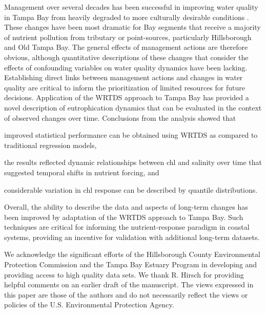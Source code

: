 \documentclass{svjour3}\usepackage[]{graphicx}\usepackage[]{color}
\begin{document}
Management over several decades has been successful in improving water quality in Tampa Bay from heavily degraded to more culturally desirable conditions \cite{Greening06}.  These changes have been most dramatic for Bay segments that receive a majority of nutrient pollution from tributary or point-sources, particularly Hillsborough and Old Tampa Bay.  The general effects of management actions are therefore obvious, although quantitative descriptions of these changes that consider the effects of confounding variables on water quality dynamics have been lacking.  Establishing direct links between management actions and changes in water quality are critical to inform the prioritization of limited resources for future decisions.  Application of the \ac{WRTDS} approach to Tampa Bay has provided a novel description of eutrophication dynamics that can be evaluated in the context of observed changes over time.  Conclusions from the analysis showed that\begin{inparaenum}[1\upshape)]
\item improved statistical performance can be obtained using \ac{WRTDS} as compared to traditional regression models,
\item the results reflected dynamic relationships between \ac{chl} and salinity over time that suggested temporal shifts in nutrient forcing, and 
\item considerable variation in \ac{chl} response can be described by quantile distributions.
\end{inparaenum}
Overall, the ability to describe the data and aspects of long-term changes has been improved by adaptation of the \ac{WRTDS} approach to Tampa Bay. Such techniques are critical for informing the nutrient-response paradigm in coastal systems, providing an incentive for validation with additional long-term datasets.

\begin{acknowledgements}
We acknowledge the significant efforts of the Hillsborough County Environmental Protection Commission and the Tampa Bay Estuary Program in developing and providing access to high quality data sets.  We thank R. Hirsch for providing helpful comments on an earlier draft of the manuscript.  The views expressed in this paper are those of the authors and do not necessarily reflect the views or policies of the U.S. Environmental Protection Agency.
\end{acknowledgements}

 

\clearpage
\end{document}

